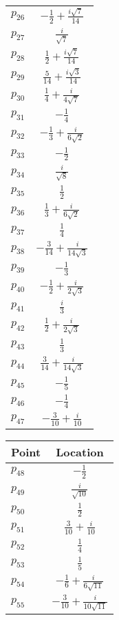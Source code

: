 \documentclass[11pt,a4paper]{article}
\numberwithin{equation}{section}
\numberwithin{table}{section}\setlength{\multlinegap}{25pt}
\begin{document}
\begin{table}
\begin{tabular}{lc}
    $p_{26}$ & $-\frac{1}{2}+\frac{i\sqrt{7}}{14}$\\
    $p_{27}$ & $\frac{i}{\sqrt{7}}$\\
    $p_{28}$ & $\frac{1}{2}+\frac{i\sqrt{7}}{14}$\\
    $p_{29}$ & $\frac{5}{14}+\frac{i\sqrt{3}}{14}$\\
    $p_{30}$ & $\frac{1}{4}+\frac{i}{4\sqrt{7}}$\\
    $p_{31}$ & $-\frac14$\\
    $p_{32}$ & $-\frac13+\frac{i}{6\sqrt{2}}$\\
    $p_{33}$ & $-\frac12$\\
    $p_{34}$ & $\frac{i}{\sqrt{8}}$\\
    $p_{35}$ & $\frac12$\\
    $p_{36}$ & $\frac13+\frac{i}{6\sqrt{2}}$\\
    $p_{37}$ & $\frac14$\\
    $p_{38}$ & $-\frac{3}{14}+\frac{i}{14\sqrt{3}}$\\
    $p_{39}$ & $-\frac13$\\
    $p_{40}$ & $-\frac12+\frac{i}{2\sqrt{3}}$\\
    $p_{41}$ & $\frac{i}{3}$\\
    $p_{42}$ & $\frac12+\frac{i}{2\sqrt{3}}$\\
    $p_{43}$ & $\frac13$\\
    $p_{44}$ & $\frac{3}{14}+\frac{i}{14\sqrt{3}}$\\
    $p_{45}$ & $-\frac15$\\
    $p_{46}$ & $-\frac14$\\
    $p_{47}$ & $-\frac{3}{10}+\frac{i}{10}$\\
    \bottomrule
    \end{tabular}\hspace{1ex}
    \begin{tabular}{lc}
    \toprule
    Point & Location\\
    \midrule
    $p_{48}$ & $-\frac12$\\
    $p_{49}$ & $\frac{i}{\sqrt{10}}$\\
    $p_{50}$ & $\frac12$\\
    $p_{51}$ & $\frac{3}{10}+\frac{i}{10}$\\
    $p_{52}$ & $\frac14$\\
    $p_{53}$ & $\frac15$\\
    $p_{54}$ & $-\frac{1}{6}+\frac{i}{6\sqrt{11}}$\\
    $p_{55}$ & $-\frac{3}{10}+\frac{i}{10\sqrt{11}}$\\

\end{tabular}
\end{table}
\end{document}
